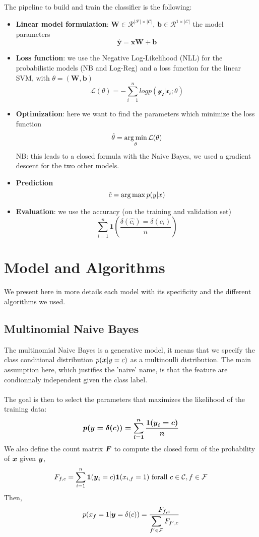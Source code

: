 \documentclass[11pt]{article}
\begin{document}
\noindent The pipeline to build and train the classifier is the following:
\begin{itemize}
	\item \textbf{Linear model formulation}: $\mathbf{W} \in \mathcal{R}^{|\mathcal{F}| \times |\mathcal{C}|}$, $\mathbf{b} \in \mathcal{R}^{1 \times |\mathcal{C}|}$ the model parameters
	\[ \mathbf{\hat{y}} = \mathbf{xW} + \mathbf{b} \]
	\item \textbf{Loss function}: we use the Negative Log-Likelihood (NLL) for the probabilistic models (NB and Log-Reg) and a loss function for the linear SVM, with $ \theta = (\mathbf{W}, \mathbf{b})$
	\[\mathcal{L}(\theta) = - \sum_{i=1}^{n} log p(\mathcal{y_i}| \mathcal{x_i}; \theta) \]
	\item \textbf{Optimization}: here we want to find the parameters which minimize the loss function
	\[ \hat{\theta} = \argmin_{\theta}{\mathcal{L}(\theta)} \]
	NB: this leads to a closed formula with the Naive Bayes, we used a gradient descent for the two other models.
	\item \textbf{Prediction}
	\[\hat{c} = \argmax{p(y|x)} \]
	\item \textbf{Evaluation}: we use the accuracy (on the training and validation set)
	\[ \sum_{i = 1}^{n} \mathbf{1}(\frac{\delta(\hat{c_i}) = \delta(c_i)}{n}) \]
\end{itemize}



\section{Model and Algorithms}

We present here in more details each model with its specificity and the different algorithms we used.

\subsection{Multinomial Naive Bayes}

The multinomial Naive Bayes \citep{murphy2012machine} is a generative model, it means that we specify the class conditional distribution $p(\boldsymbol{x} | y=c)$ as a multinoulli distribution. The main assumption here, which  justifies the 'naive' name, is that the feature are condionnaly independent given the class label.\\ \\
The goal is then to select the parameters that maximizes the likelihood of the training data:
    \[p(\boldsymbol{y} = \boldmath{\delta(c)}) = \sum_{i = 1}^n \frac{1(\boldsymbol{y}_i = c)}{n}\]
We also define the count matrix $\boldsymbol{F}$ to compute the closed form of the probability of $\boldsymbol{x}$ given $\boldsymbol{y}$,
\[F_{f,c} = \sum_{i = 1}^n \mathbf{1}(\boldsymbol{y}_i = c) \mathbf{1}(x_{i, f} = 1) \mathrm{\ for all\ } c\in \mathcal{C}, f\in \mathcal{F}\] 
Then,
      \[p(x_f = 1 | \boldsymbol{y}=\boldmath{\delta(c)}) = \frac{F_{f, c}}{\displaystyle \sum_{f' \in \mathcal{F}} F_{f',c}}  \]
\end{document}
